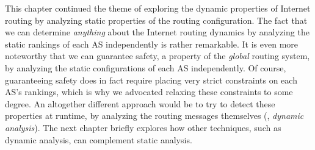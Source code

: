 This chapter continued the theme of exploring the dynamic properties of
Internet routing by analyzing static properties of the routing
configuration.  The fact that we can determine {\em anything} about the
Internet routing dynamics by analyzing the static rankings of each AS
independently is rather remarkable.  It is even more noteworthy that we
can guarantee safety, a property of the {\em global} routing system, by
analyzing the static configurations of each AS independently.  Of
course, guaranteeing safety does in fact require placing very strict
constraints on each AS's rankings, which is why we advocated relaxing
these constraints to some degree.  An altogether different approach
would be to try to detect these properties at runtime, by analyzing the
routing messages themselves (\ie, {\em dynamic analysis}).  The next
chapter briefly explores how other techniques, such as dynamic analysis,
can complement static analysis.




